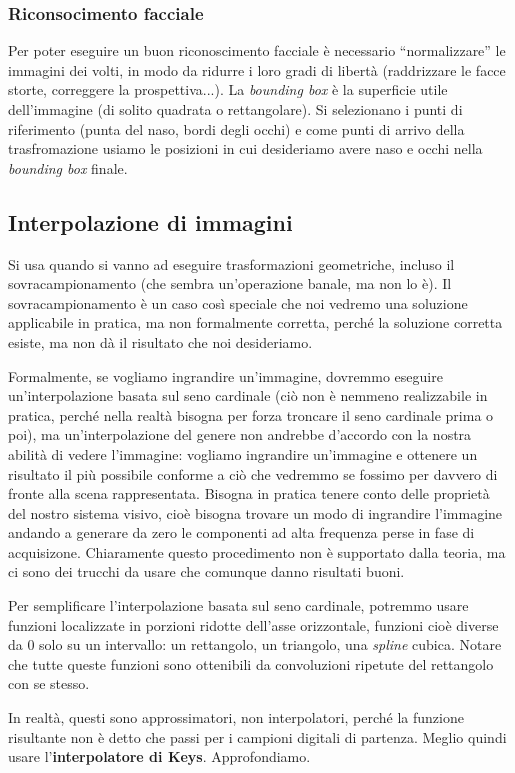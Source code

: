 \documentclass[a4paper,11pt]{article}
\begin{document}
\subsubsection{Riconsocimento facciale}
Per poter eseguire un buon riconoscimento facciale è necessario ``normalizzare'' le immagini dei volti, in modo da ridurre
i loro gradi di libertà (raddrizzare le facce storte, correggere la prospettiva...).
La \textit{bounding box} è la superficie utile dell'immagine (di solito quadrata o rettangolare). Si selezionano i punti di riferimento
(punta del naso, bordi degli occhi) e come punti di arrivo della trasfromazione usiamo le posizioni in cui desideriamo avere naso e occhi nella
\textit{bounding box} finale.

\subsection{Interpolazione di immagini}
Si usa quando si vanno ad eseguire trasformazioni geometriche, incluso il sovracampionamento (che sembra un'operazione banale, ma non lo è).
Il sovracampionamento è un caso così speciale che noi vedremo una soluzione applicabile in pratica, ma non formalmente corretta, perché
la soluzione corretta esiste, ma non dà il risultato che noi desideriamo.
\par
Formalmente, se vogliamo ingrandire un'immagine, dovremmo eseguire un'interpolazione basata sul seno cardinale (ciò non è nemmeno
realizzabile in pratica, perché nella realtà bisogna per forza troncare il seno cardinale prima o poi), ma un'interpolazione del genere non andrebbe d'accordo
con la nostra abilità di vedere l'immagine: vogliamo ingrandire un'immagine e ottenere un risultato il più possibile conforme a ciò che vedremmo
se fossimo per davvero di fronte alla scena rappresentata. Bisogna in pratica tenere conto delle proprietà del nostro sistema visivo,
cioè bisogna trovare un modo di ingrandire l'immagine andando a generare da zero le componenti ad alta frequenza perse in fase di acquisizone.
Chiaramente questo procedimento non è supportato dalla teoria, ma ci sono dei trucchi da usare che comunque danno risultati buoni.
\par
Per semplificare l'interpolazione basata sul seno cardinale, potremmo usare funzioni localizzate in porzioni ridotte dell'asse orizzontale,
funzioni cioè diverse da 0 solo su un intervallo: un rettangolo, un triangolo, una \textit{spline} cubica. Notare che tutte queste funzioni sono
ottenibili da convoluzioni ripetute del rettangolo con se stesso.
\par
In realtà, questi sono approssimatori, non interpolatori, perché la funzione risultante non è detto che passi per i campioni digitali di partenza.
Meglio quindi usare l'\textbf{interpolatore di Keys}. Approfondiamo.
\end{document}
